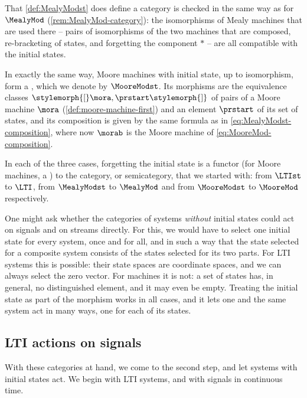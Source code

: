 That \cref{def:MealyModst} does define a category is checked in the same way as for $\MealyMod$ (\cref{rem:MealyMod-category}): the isomorphisms of Mealy machines that are used there -- pairs of isomorphisms of the two machines that are composed, re-bracketing of states, and forgetting the component $\ast$ -- are all compatible with the initial states.

In exactly the same way, Moore machines with initial state, up to isomorphism, form a , which we denote by $\MooreModst$.
Its morphisms are the equivalence classes $\stylemorph{[}\mora, \prstart\stylemorph{]}$ of pairs of a Moore machine $\mora$ (\cref{def:moore-machine-first}) and an element $\prstart$ of its set of states, and its composition is given by the same formula as in \cref{eq:MealyModst-composition}, where now $\morab$ is the Moore machine of \cref{eq:MooreMod-composition}.

In each of the three cases, forgetting the initial state is a functor (for Moore machines, a ) to the category, or semicategory, that we started with: from $\LTIst$ to $\LTI$, from $\MealyModst$ to $\MealyMod$ and from $\MooreModst$ to $\MooreMod$ respectively.

\begin{remark}
    \label{rem:why-initial-states}
    One might ask whether the categories of systems \emph{without} initial states could act on signals and on streams directly.
    For this, we would have to select one initial state for every system, once and for all, and in such a way that the state selected for a composite system consists of the states selected for its two parts.
    For LTI systems this is possible: their state spaces are coordinate spaces, and we can always select the zero vector.
    For machines it is not: a set of states has, in general, no distinguished element, and it may even be empty.
    Treating the initial state as part of the morphism works in all cases, and it lets one and the same system act in many ways, one for each of its states.
\end{remark}


\subsection{LTI actions on signals}

With these categories at hand, we come to the second step, and let systems with initial states act.
We begin with LTI systems, and with signals in continuous time.

